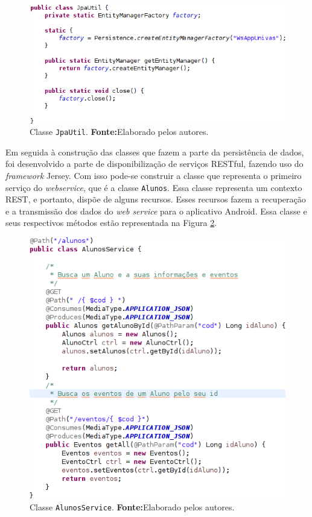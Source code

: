 		\pagebreak
		\begin{figure}[h!]
			\centerline{\includegraphics[scale=0.7]{./imagens/2_q_metodologico/qm12.png}}
			\caption[Classe \texttt{JpaUtil}]{Classe \texttt{JpaUtil}.
			\textbf{Fonte:}Elaborado pelos autores.}
			\label{fig:qm12}
		\end{figure}
		
	\par Em seguida à construção das classes que fazem a parte da persistência de
dados, foi desenvolvido a parte de disponibilização de serviços
RESTful, fazendo uso do \textit{framework} Jersey. Com isso
pode-se construir a classe que representa o primeiro serviço do
\textit{webservice}, que é a classe \texttt{Alunos}. Essa classe representa um
contexto REST, e portanto, dispõe de alguns recursos. Esses recursos fazem a
recuperação e a transmissão dos dados do \textit{web service} para o aplicativo
Android. Essa classe e seus respectivos métodos  estão representada na
Figura \ref{fig:qm13}.

		\begin{figure}[h!]
			\centerline{\includegraphics[scale=0.7]{./imagens/2_q_metodologico/qm13.png}}
			\caption[Classe \texttt{AlunosService}]{Classe \texttt{AlunosService}.
			\textbf{Fonte:}Elaborado pelos autores.}
			\label{fig:qm13}
		\end{figure}
		

